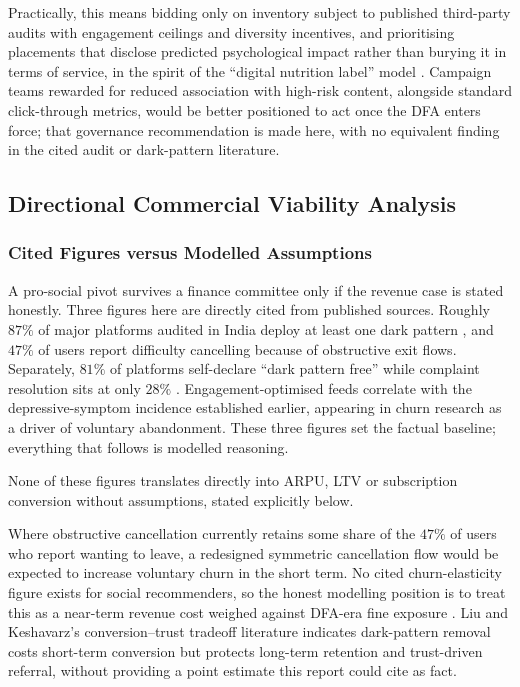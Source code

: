 \documentclass[11pt]{article}
\begin{document}
Practically, this means bidding only on inventory subject to published third-party audits with engagement ceilings and diversity incentives, and prioritising placements that disclose predicted psychological impact rather than burying it in terms of service, in the spirit of the ``digital nutrition label'' model \parencites[20]{3303310}. Campaign teams rewarded for reduced association with high-risk content, alongside standard click-through metrics, would be better positioned to act once the DFA enters force; that governance recommendation is made here, with no equivalent finding in the cited audit or dark-pattern literature.

\subsection{Directional Commercial Viability Analysis}

\subsubsection{Cited Figures versus Modelled Assumptions}
\label{sec:commercial_viability_analysis} A pro-social pivot survives a finance committee only if the revenue case is stated honestly. Three figures here are directly cited from published sources. Roughly $87\%$ of major platforms audited in India deploy at least one dark pattern \parencites[2]{6295677}[4]{6087241}, and $47\%$ of users report difficulty cancelling because of obstructive exit flows. Separately, $81\%$ of platforms self-declare ``dark pattern free'' while complaint resolution sits at only $28\%$ \parencites[12]{6295677}. Engagement-optimised feeds correlate \parencites[20]{3303310} with the depressive-symptom incidence established earlier, appearing in churn research as a driver of voluntary abandonment. These three figures set the factual baseline; everything that follows is modelled reasoning.

None of these figures translates directly into ARPU, LTV or subscription conversion without assumptions, stated explicitly below.

Where obstructive cancellation currently retains some share of the $47\%$ of users who report wanting to leave, a redesigned symmetric cancellation flow would be expected to increase voluntary churn in the short term. No cited churn-elasticity figure exists for social recommenders, so the honest modelling position is to treat this as a near-term revenue cost weighed against DFA-era fine exposure \parencites[390]{7896734}. Liu and Keshavarz's conversion--trust tradeoff literature \parencites[37]{6087241} indicates dark-pattern removal costs short-term conversion but protects long-term retention and trust-driven referral, without providing a point estimate this report could cite as fact.
\end{document}

